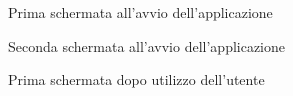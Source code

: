 \begin{figure}[h]
    \centering
    \caption{Prima schermata all'avvio dell'applicazione}
    \label{fig_schermata1}
\end{figure}

\begin{figure}[h]
    \centering
    \caption{Seconda schermata all'avvio dell'applicazione}
    \label{fig_schermata1}
\end{figure}

\begin{figure}[h]
    \centering
    \caption{Prima schermata dopo utilizzo dell'utente}
    \label{fig_schermata1}
\end{figure}

